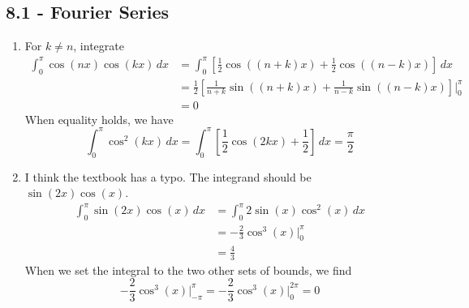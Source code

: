 \documentclass[a4paper]{article}
\begin{document}
\subsection{\textsf{8.1 - Fourier Series}}

\begin{enumerate}[label=(\alph*)]
	\item For \( k \neq n \), integrate
	\begin{align*}
		\int^{\pi}_{0} \cos\!\left(nx\right) \cos\!\left(kx\right)  \, dx & = \int^{\pi}_{0} \!\left[ \frac{1}{2} \cos\!\left(\!\left( n + k \right) x \right) + \frac{1}{2} \cos\!\left(\!\left( n - k \right) x \right) \right] \, dx & \\ 
										  & = \frac{1}{2} \!\left[ \frac{1}{n + k} \sin\!\left(\!\left( n + k \right) x \right) + \frac{1}{n - k} \sin\!\left(\!\left( n - k \right) x \right) \right] \Big|^{\pi}_{0} \\
										  & = 0
	\end{align*}
	When equality holds, we have
	\[
		\int^{\pi}_{0} \cos^{2}\!\left(kx\right) \, dx = \int^{\pi}_{0} \!\left[ \frac{1}{2} \cos\!\left(2kx\right) + \frac{1}{2} \right] \, dx = \frac{\pi}{2}
	\]
	\item I think the textbook has a typo. The integrand should be \( \sin\!\left(2x\right) \cos\!\left(x\right)  \).
	\begin{align*}
		\int^{\pi}_{0} \sin\!\left(2x\right) \cos\!\left(x\right) \, dx & = \int^{\pi}_{0} 2 \sin\!\left(x\right) \cos^{2}\!\left(x\right)  \, dx \\
										& =  -\frac{2}{3} \cos^{3}\!\left(x\right) \Big|^{\pi}_{0} \\
										& = \frac{4}{3}
	\end{align*}
	When we set the integral to the two other sets of bounds, we find
	\[
		-\frac{2}{3}\cos^{3}\!\left(x\right) \Big|^{\pi}_{-\pi} = -\frac{2}{3}\cos^{3}\!\left(x\right) \Big|^{2 \pi}_{0} = 0
	\]
\end{enumerate}
\end{document}
